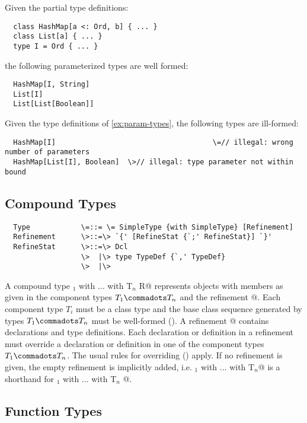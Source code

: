 \documentclass[11pt]{report}
\begin{document}
\example\label{ex:param-types}
Given the partial type definitions:

\begin{verbatim}
  class HashMap[a <: Ord, b] { ... }
  class List[a] { ... }
  type I = Ord { ... }
\end{verbatim}

the following parameterized types are well formed:

\begin{verbatim}
  HashMap[I, String]
  List[I]
  List[List[Boolean]]
\end{verbatim}

\example Given the type definitions of \ref{ex:param-types},
the following types are ill-formed:

\begin{verbatim}
  HashMap[I]			                         \=// illegal: wrong number of parameters
  HashMap[List[I], Boolean]  \>// illegal: type parameter not within bound
\end{verbatim}

\subsection{Compound Types}
\label{sec:compound-types}

\syntax\begin{verbatim} 
  Type            \=::= \= SimpleType {with SimpleType} [Refinement]
  Refinement      \>::=\> `{' [RefineStat {`;' RefineStat}] `}'
  RefineStat      \>::=\> Dcl
                  \>  |\> type TypeDef {`,' TypeDef}
                  \>  |\>
\end{verbatim}

A compound type \verb@T$_1$ with ... with T$_n$ {R}@ represents
objects with members as given in the component types $T_1 \commadots
T_n$ and the refinement @. Each component type $T_i$ must be a
class type and the base class sequence generated by types $T_1
\commadots T_n$ must be well-formed (). A
refinement @ contains declarations and type
definitions. Each declaration or definition in a refinement must
override a declaration or definition in one of the component types
$T_1 \commadots T_n$. The usual rules for overriding (\sref{})
apply. If no refinement is given, the empty refinement is implicitly
added, i.e. \verb@T$_1$ with ... with T$_n$@ is a shorthand for
\verb@T$_1$ with ... with T$_n$ {}@.
 
\subsection{Function Types}
\label{sec:function-types}
\end{document}
